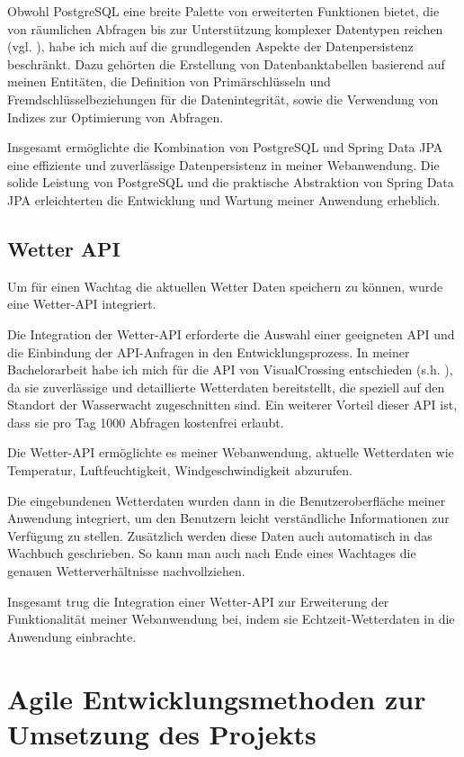 \documentclass[fontsize=12pt,openright,oneside,paper=a4,BCOR=1cm]{scrbook}
\begin{document}
Obwohl PostgreSQL eine breite Palette von erweiterten Funktionen bietet, die von räumlichen Abfragen bis zur Unterstützung komplexer Datentypen reichen (vgl. \cite{postgres}), habe ich mich auf die grundlegenden Aspekte der Datenpersistenz beschränkt. Dazu gehörten die Erstellung von Datenbanktabellen basierend auf meinen Entitäten, die Definition von Primärschlüsseln und Fremdschlüsselbeziehungen für die Datenintegrität, sowie die Verwendung von Indizes zur Optimierung von Abfragen.

Insgesamt ermöglichte die Kombination von PostgreSQL und Spring Data JPA eine effiziente und zuverlässige Datenpersistenz in meiner Webanwendung. Die solide Leistung von PostgreSQL und die praktische Abstraktion von Spring Data JPA erleichterten die Entwicklung und Wartung meiner Anwendung erheblich.

\subsection{Wetter API}
Um für einen Wachtag die aktuellen Wetter Daten speichern zu können, wurde eine Wetter-API integriert.

Die Integration der Wetter-API erforderte die Auswahl einer geeigneten API und die Einbindung der API-Anfragen in den Entwicklungsprozess. In meiner Bachelorarbeit habe ich mich für die API von VisualCrossing entschieden (s.h. \cite{weatherapi}), da sie zuverlässige und detaillierte Wetterdaten bereitstellt, die speziell auf den Standort der Wasserwacht zugeschnitten sind. Ein weiterer Vorteil dieser API ist, dass sie pro Tag 1000 Abfragen kostenfrei erlaubt.

Die Wetter-API ermöglichte es meiner Webanwendung, aktuelle Wetterdaten wie Temperatur, Luftfeuchtigkeit, Windgeschwindigkeit abzurufen.

Die eingebundenen Wetterdaten wurden dann in die Benutzeroberfläche meiner Anwendung integriert, um den Benutzern leicht verständliche Informationen zur Verfügung zu stellen. Zusätzlich werden diese Daten auch automatisch in das Wachbuch geschrieben. So kann man auch nach Ende eines Wachtages die genauen Wetterverhältnisse nachvollziehen.

Insgesamt trug die Integration einer Wetter-API zur Erweiterung der Funktionalität meiner Webanwendung bei, indem sie Echtzeit-Wetterdaten in die Anwendung einbrachte.


\section{Agile Entwicklungsmethoden zur Umsetzung des Projekts}
\end{document}
